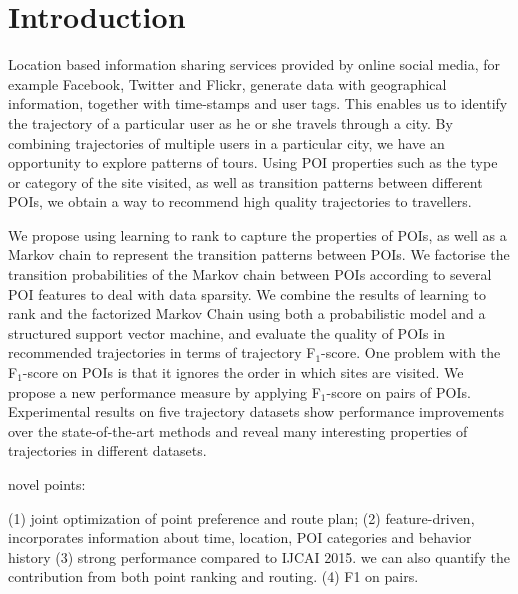 \section{Introduction}
\label{sec:introduction}
Location based information sharing services provided by online social media,
for example Facebook, Twitter and Flickr, generate data with geographical information,
together with time-stamps and user tags.
This enables us to identify the trajectory of a particular user as he or she travels through
a city. By combining trajectories of multiple users in a particular city, we
have an opportunity to explore patterns of tours. Using POI properties such as the type
or category of the site visited,
as well as transition patterns between different POIs,
we obtain a way to recommend high quality trajectories to travellers.


We propose using learning to rank to capture the properties of POIs, as well as a Markov chain to
represent the transition patterns between POIs.
We factorise the transition probabilities of the Markov chain between POIs
according to several POI features to deal with data sparsity.
We combine the results of learning to rank and the factorized Markov Chain using both a probabilistic model and a structured
support vector machine, and evaluate the quality of POIs in recommended trajectories in terms of trajectory F$_1$-score\cite{ijcai15}. One problem with the F$_1$-score on POIs is that it ignores
the order in which sites are visited.
We propose a new performance measure by applying F$_1$-score on pairs of POIs.
Experimental results on five trajectory datasets show performance improvements over the state-of-the-art methods and
reveal many interesting properties of trajectories in different datasets.


novel points:

(1) joint optimization of point preference and route plan;
(2) feature-driven, incorporates information about time, location, POI categories and behavior history
(3) strong performance compared to IJCAI 2015. we can also quantify the contribution from both point ranking and routing.
(4) F1 on pairs.
